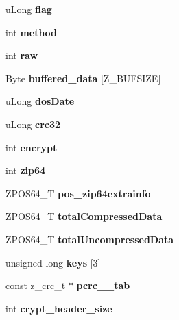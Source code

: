 \begin{DoxyCompactItemize}
u\+Long {\bfseries flag}
\item 
\mbox{\label{structcurfile64__info_afc121266093b2d0e27f309dc4dc8cd2f}} 
int {\bfseries method}
\item 
\mbox{\label{structcurfile64__info_ad86ea5e726a03803f04c05b405af370a}} 
int {\bfseries raw}
\item 
\mbox{\label{structcurfile64__info_a3d7c36ae37ab8007531d1edd26f07bcf}} 
Byte {\bfseries buffered\+\_\+data} \mbox{[}Z\+\_\+\+B\+U\+F\+S\+I\+ZE\mbox{]}
\item 
\mbox{\label{structcurfile64__info_aa1f0ca7db2e2129524953a29fa822933}} 
u\+Long {\bfseries dos\+Date}
\item 
\mbox{\label{structcurfile64__info_aa15643650c3d8564776ea87873134364}} 
u\+Long {\bfseries crc32}
\item 
\mbox{\label{structcurfile64__info_ae25bb2a6b1e0b04f60011089db7fa123}} 
int {\bfseries encrypt}
\item 
\mbox{\label{structcurfile64__info_ad8f4cd023ee61e46aac147d266be0538}} 
int {\bfseries zip64}
\item 
\mbox{\label{structcurfile64__info_a45dfe9b2562314f29f7df1bad71da528}} 
Z\+P\+O\+S64\+\_\+T {\bfseries pos\+\_\+zip64extrainfo}
\item 
\mbox{\label{structcurfile64__info_aadb153e7bdc293b685396e92830ed51e}} 
Z\+P\+O\+S64\+\_\+T {\bfseries total\+Compressed\+Data}
\item 
\mbox{\label{structcurfile64__info_aeb933f725cb47e023135657e22173c1d}} 
Z\+P\+O\+S64\+\_\+T {\bfseries total\+Uncompressed\+Data}
\item 
\mbox{\label{structcurfile64__info_a515780a744e2ee3f95804468e2752ee2}} 
unsigned long {\bfseries keys} \mbox{[}3\mbox{]}
\item 
\mbox{\label{structcurfile64__info_a1cd2399f7955e47d329970b9f92608ba}} 
const z\+\_\+crc\+\_\+t $\ast$ {\bfseries pcrc\+\_\+\_\+tab}
\item 
\mbox{\label{structcurfile64__info_a17e9931ff5683fded26eb3d99d80bf0e}} 
int {\bfseries crypt\+\_\+header\+\_\+size}
\end{DoxyCompactItemize}


